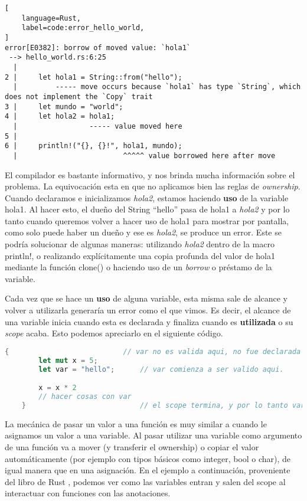 \begin{lstlisting}[
    language=Rust,
    label=code:error_hello_world,
]
error[E0382]: borrow of moved value: `hola1`
 --> hello_world.rs:6:25
  |
2 |     let hola1 = String::from("hello");
  |         ----- move occurs because `hola1` has type `String`, which does not implement the `Copy` trait
3 |     let mundo = "world";
4 |     let hola2 = hola1;
  |                 ----- value moved here
5 |
6 |     println!("{}, {}!", hola1, mundo);
  |                         ^^^^^ value borrowed here after move
\end{lstlisting}

El compilador es bastante informativo, y nos brinda mucha información sobre el problema. La equivocación esta en que no aplicamos bien las reglas de \textit{ownership}. Cuando declaramos e inicializamos \textit{hola2}, estamos haciendo \textbf{uso} de la variable hola1. Al hacer esto, el dueño del String ``hello'' pasa de hola1 a \textit{hola2} y por lo tanto cuando queremos volver a hacer uso de hola1 para mostrar por pantalla, como solo puede haber un dueño y ese es \textit{hola2}, se produce un error. Este se podría solucionar de algunas maneras: utilizando \textit{hola2} dentro de la macro println!, o realizando explícitamente una copia profunda del valor de hola1 mediante la función clone() o haciendo uso de un \textit{borrow} o préstamo de la variable.

Cada vez que se hace un \textbf{uso} de alguna variable, esta misma sale de alcance y volver a utilizarla generaría un error como el que vimos. Es decir, el alcance de una variable inicia cuando esta es declarada y finaliza cuando es \textbf{utilizada} o su \textit{scope} acaba. Esto podemos apreciarlo en el siguiente código.

\begin{lstlisting}[language=Rust]
    {                           // var no es valida aqui, no fue declarada todavia
        let mut x = 5;
        let var = "hello";      // var comienza a ser valido aqui.

        x = x * 2
        // hacer cosas con var
    }                           // el scope termina, y por lo tanto var no es mas valida
\end{lstlisting}


La mecánica de pasar un valor a una función es muy similar a cuando le asignamos un valor a una variable. Al pasar utilizar una variable como argumento de una función va a mover (y transferir el ownership) o copiar el valor automáticamente (por ejemplo con tipos básicos como integer, bool o char), de igual manera que en una asignación. En el ejemplo a continuación, proveniente del libro de Rust \citep{rustbook}, podemos ver como  las variables entran y salen del scope al interactuar con funciones con las anotaciones.

